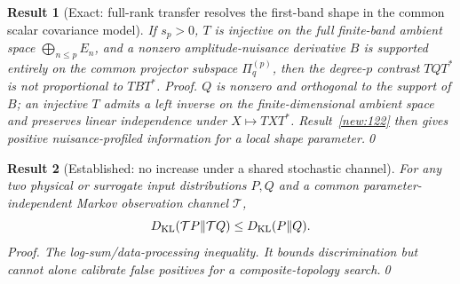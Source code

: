 \documentclass[aps,prd,onecolumn,notitlepage,groupedaddress,11pt]{revtex4-2}
\newtheorem{result}{Result}
\begin{document}
\begin{result}[\textsf{Exact}: full-rank transfer resolves the first-band shape in the common scalar covariance model]\label{new:123}
If $s_p>0$, $T$ is injective on the full finite-band ambient space $\bigoplus_{n\le p}E_n$, and a nonzero amplitude-nuisance derivative $B$ is supported entirely on the common projector subspace $\Pi_q^{(p)}$, then the degree-$p$ contrast $TQT^*$ is not proportional to $TBT^*$. \textit{Proof.} $Q$ is nonzero and orthogonal to the support of $B$; an injective $T$ admits a left inverse on the finite-dimensional ambient space and preserves linear independence under $X\mapsto TXT^*$. Result~\ref{new:122} then gives positive nuisance-profiled information for a local shape parameter.\qed
\end{result}
\begin{result}[\textsf{Established}: no increase under a shared stochastic channel]\label{new:124}
For any two physical or surrogate input distributions $P,Q$ and a common parameter-independent Markov observation channel $\mathcal T$,
\begin{equation}\label{new:eq124}
D_{\rm KL}(\mathcal TP\Vert\mathcal TQ)\le D_{\rm KL}(P\Vert Q).
\end{equation}
\textit{Proof.} The log-sum/data-processing inequality. It bounds discrimination but cannot alone calibrate false positives for a composite-topology search.\qed
\end{result}
\end{document}
